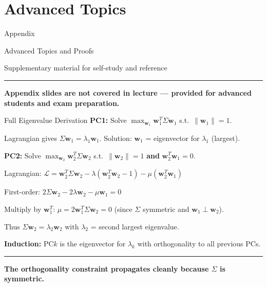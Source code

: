 \documentclass[8pt,aspectratio=169]{beamer}
\newcommand{\bottomnote}[1]{%
\vfill
\vspace{-2mm}
\textcolor{mllavender2}{\rule{\textwidth}{0.4pt}}
\vspace{1mm}
\footnotesize
\textbf{#1}
}
\begin{document}
\appendix
\section*{Advanced Topics}

\begin{frame}
\begin{center}
\vspace{2cm}
{\Huge \textcolor{mlpurple}{Appendix}}

\vspace{0.5cm}
{\Large Advanced Topics and Proofs}

\vspace{0.5cm}
{\normalsize Supplementary material for self-study and reference}
\end{center}
\bottomnote{Appendix slides are not covered in lecture --- provided for advanced students and exam preparation.}
\end{frame}

\begin{frame}[t]{Full Eigenvalue Derivation}
\textbf{PC1:} Solve $\max_{\mathbf{w}_1} \mathbf{w}_1^T \Sigma \mathbf{w}_1$ s.t.\ $\|\mathbf{w}_1\|=1$.

Lagrangian gives $\Sigma \mathbf{w}_1 = \lambda_1 \mathbf{w}_1$. Solution: $\mathbf{w}_1$ = eigenvector for $\lambda_1$ (largest).

\vspace{0.3em}
\textbf{PC2:} Solve $\max_{\mathbf{w}_2} \mathbf{w}_2^T \Sigma \mathbf{w}_2$ s.t.\ $\|\mathbf{w}_2\|=1$ \textbf{and} $\mathbf{w}_2^T \mathbf{w}_1 = 0$.

Lagrangian: $\mathcal{L} = \mathbf{w}_2^T \Sigma \mathbf{w}_2 - \lambda(\mathbf{w}_2^T \mathbf{w}_2 - 1) - \mu(\mathbf{w}_2^T \mathbf{w}_1)$

First-order: $2\Sigma \mathbf{w}_2 - 2\lambda \mathbf{w}_2 - \mu \mathbf{w}_1 = 0$

Multiply by $\mathbf{w}_1^T$: $\mu = 2\mathbf{w}_1^T \Sigma \mathbf{w}_2 = 0$ (since $\Sigma$ symmetric and $\mathbf{w}_1 \perp \mathbf{w}_2$).

Thus $\Sigma \mathbf{w}_2 = \lambda_2 \mathbf{w}_2$ with $\lambda_2$ = second largest eigenvalue.

\vspace{0.3em}
\textbf{Induction:} PC$k$ is the eigenvector for $\lambda_k$ with orthogonality to all previous PCs.
\bottomnote{The orthogonality constraint propagates cleanly because $\Sigma$ is symmetric.}
\end{frame}
\end{document}
